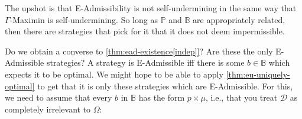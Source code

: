 \documentclass[a4paper]{article}
\newtheorem{proposition}[theorem]{Proposition}
\renewcommand\P{\mathbb{P}} %
\newcommand\EU{\mathrm{EU}}
\newcommand\EAd{\mathrm{EAd}}
\newcommand{\D}{\mathcal{D}}
\newcommand{\Decs}{\mathcal{D}}
\renewcommand\S{\mathcal{S}}
\newcommand\s{\mathsf{s}}
\newcommand{\IB}{\mathbb{B}}
\newcommand{\IP}{\P}
\newcommand{\todoold}[2][]{\todo[backgroundcolor=white,bordercolor=orange!10,linecolor=gray!10, #1,caption={},textcolor=gray]{Pre-rev: #2}}
\newcommand{\todooldinfo}[2][]{\todoold[#1]{#2}}
\renewcommand{\color}[1]{}
\newcommand{\Strategies}{\S}
\newenvironment{CCM rewritten}
{\begingroup\color{blue}} %
{\endgroup}              %
\begin{document}
 
%	
The upshot is that E-Admissibility is not self-undermining in the same way that $\Gamma$-Maximin is self-undermining. So long as $\IP$ and $\IB$ are appropriately related, then there are strategies that pick for it that it does not deem impermissible.


Do we obtain a converse to \cref{thm:ead-existence[indep]}?  Are these the only E-Admissible strategies? 
A strategy is E-Admissible iff there is some $b\in\IB$ which expects it to be optimal.
We might hope to be able to apply \cref{thm:eu-uniquely-optimal} to get that it is only these strategies which are E-Admissible. For this, we need to assume that every $b$ in $\IB$ has the form $p\times\mu$, i.e., that you treat $\D$ as completely irrelevant to $\Omega$:

\end{document}
